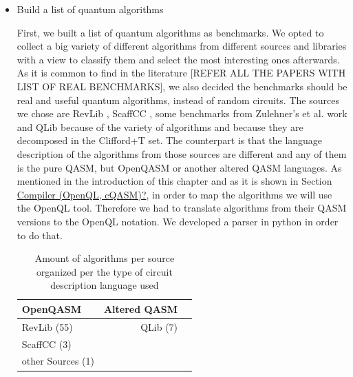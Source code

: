 \begin{itemize}
\item Build a list of quantum algorithms
\label{sec:org4239dda}

First, we built a list of quantum algorithms as benchmarks.
We opted to collect a big variety of different algorithms from different sources and libraries with a view to classify them and select the most interesting ones afterwards.
As it is common to find in the literature [REFER ALL THE PAPERS WITH LIST OF REAL BENCHMARKS], we also decided the benchmarks should be real and useful quantum algorithms, instead of random circuits.
The sources we chose are RevLib \cite{Wille_2008}, ScaffCC \cite{JavadiAbhari_2015}, some benchmarks from Zulehner's et al. work \cite{zulehner17:effic_method_mappin_quant_circuit} and QLib \cite{Lin_2014} because of the variety of algorithms and because they are decomposed in the Clifford+T set.
The counterpart is that the language description of the algorithms from those sources are different and any of them is the pure QASM, but OpenQASM or another altered QASM languages.
As mentioned in the introduction of this chapter and as it is shown in Section \hyperref[sec:org7871930]{Compiler (OpenQL, cQASM)?}, in order to map the algorithms we will use the OpenQL tool.
Therefore we had to translate algorithms from their QASM versions to the OpenQL notation.
We developed a parser in python in order to do that.

\begin{table}[htbp]
\caption{\label{tab:orgba17510}
Amount of algorithms per source organized per the type of circuit description language used}
\centering
\begin{tabular}{lrr}
\hline
OpenQASM & Altered QASM\\
\hline
RevLib (55) & QLib (7)\\
ScaffCC (3) & \\
other Sources (1) & \\
\hline
\end{tabular}
\end{table}


\end{itemize}
